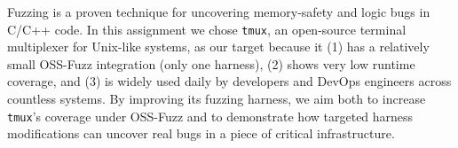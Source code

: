 Fuzzing is a proven technique for uncovering memory‐safety and logic bugs in
C/C++ code. In this assignment we chose \texttt{tmux}, an open-source terminal
multiplexer for Unix-like systems, as our target because it (1) has a relatively
small OSS-Fuzz integration (only one harness), (2) shows very low runtime
coverage, and (3) is widely used daily by developers and DevOps engineers across
countless systems. By improving its fuzzing harness, we aim both to increase
\texttt{tmux}'s coverage under OSS-Fuzz and to demonstrate how targeted harness
modifications can uncover real bugs in a piece of critical infrastructure.
